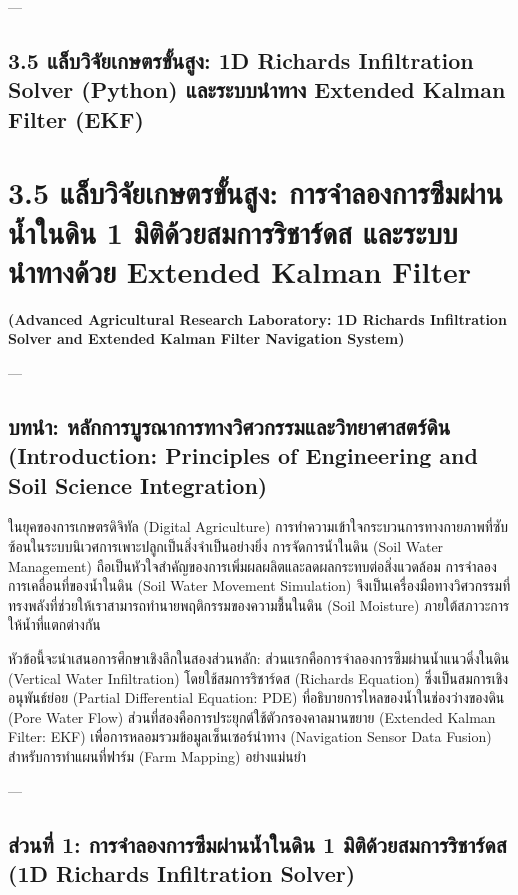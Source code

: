 \documentclass[11pt,a4paper,openany]{report}
\begin{document}
---

\section{3.5 แล็บวิจัยเกษตรขั้นสูง: 1D Richards Infiltration Solver (Python) และระบบนำทาง Extended Kalman Filter (EKF)}


\chapter{3.5 แล็บวิจัยเกษตรขั้นสูง: การจำลองการซึมผ่านน้ำในดิน 1 มิติด้วยสมการริชาร์ดส และระบบนำทางด้วย Extended Kalman Filter}


\textbf{(Advanced Agricultural Research Laboratory: 1D Richards Infiltration Solver and Extended Kalman Filter Navigation System)}

---

\section{บทนำ: หลักการบูรณาการทางวิศวกรรมและวิทยาศาสตร์ดิน (Introduction: Principles of Engineering and Soil Science Integration)}


ในยุคของการเกษตรดิจิทัล (Digital Agriculture) การทำความเข้าใจกระบวนการทางกายภาพที่ซับซ้อนในระบบนิเวศการเพาะปลูกเป็นสิ่งจำเป็นอย่างยิ่ง การจัดการน้ำในดิน (Soil Water Management) ถือเป็นหัวใจสำคัญของการเพิ่มผลผลิตและลดผลกระทบต่อสิ่งแวดล้อม การจำลองการเคลื่อนที่ของน้ำในดิน (Soil Water Movement Simulation) จึงเป็นเครื่องมือทางวิศวกรรมที่ทรงพลังที่ช่วยให้เราสามารถทำนายพฤติกรรมของความชื้นในดิน (Soil Moisture) ภายใต้สภาวะการให้น้ำที่แตกต่างกัน

หัวข้อนี้จะนำเสนอการศึกษาเชิงลึกในสองส่วนหลัก: ส่วนแรกคือการจำลองการซึมผ่านน้ำแนวดิ่งในดิน (Vertical Water Infiltration) โดยใช้สมการริชาร์ดส (Richards Equation) ซึ่งเป็นสมการเชิงอนุพันธ์ย่อย (Partial Differential Equation: PDE) ที่อธิบายการไหลของน้ำในช่องว่างของดิน (Pore Water Flow) ส่วนที่สองคือการประยุกต์ใช้ตัวกรองคาลมานขยาย (Extended Kalman Filter: EKF) เพื่อการหลอมรวมข้อมูลเซ็นเซอร์นำทาง (Navigation Sensor Data Fusion) สำหรับการทำแผนที่ฟาร์ม (Farm Mapping) อย่างแม่นยำ

---

\section{ส่วนที่ 1: การจำลองการซึมผ่านน้ำในดิน 1 มิติด้วยสมการริชาร์ดส (1D Richards Infiltration Solver)}
\end{document}
